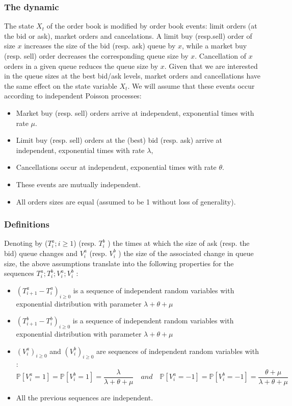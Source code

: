 \documentclass{article}
\begin{document}
\subsubsection{The dynamic}
The state $X_{t}$ of the order book is modified by order book events: limit orders (at the bid or ask),
market orders and cancelations. A limit buy (resp.sell) order of size $x$ increases the size of the bid (resp. ask) queue by $x$, while a market buy (resp. sell) order decreases the corresponding queue size by $x$. Cancellation of $x$ orders in a given queue reduces the queue size by $x$. Given that we are interested in the queue sizes at the best bid/ask levels, market orders and cancellations have the same effect on the state variable $X_{t}$.
We will assume that these events occur according to independent Poisson processes:
\begin{itemize}
\item Market buy (resp. sell) orders arrive at independent, exponential times with rate $\mu$.
\item Limit buy (resp. sell) orders at the (best) bid (resp. ask) arrive at independent, exponential
times with rate $\lambda$,
\item Cancellations occur at independent, exponential times with rate $\theta$.
\item These events are mutually independent.
\item All orders sizes are equal (assumed to be 1 without loss of generality).
\end{itemize}
\newpage 
\subsubsection{Definitions}
Denoting by ($T^{a}_{i} ; i \geq 1$) (resp. $T^{b}_{i}$ ) the times at which the size of ask (resp. the bid) queue changes
and $V^{a}_{i}$ (resp. $V^{b}_{i}$ ) the size of the associated change in queue size, the above assumptions translate
into the following properties for the sequences $T^{a}_{i}; T^{b}_{i}; V^{a}_{i}; V^{b}_{i}$ :
\begin{itemize}
\item $(T^{a}_{i+1} - T^{a}_{i})_{i \geq 0}$ is a sequence of independent random variables with exponential distribution
with parameter $\lambda+\theta+\mu$

\item $(T^{b}_{i+1} - T^{b}_{i})_{i \geq 0}$ is a sequence of independent random variables with exponential distribution
with parameter $\lambda+\theta+\mu$

\item $(V^{a}_{i})_{i \geq 0}$ and $(V^{b}_{i})_{i \geq 0}$ are sequences of independent random variables with :
\begin{equation}
\mathbb{P}[V^{a}_{i} = 1] = \mathbb{P}[V^{b}_{i} = 1]  = \frac{\lambda}{\lambda+\theta+\mu} \quad and \quad \mathbb{P}[V^{a}_{i} = -1] = \mathbb{P}[V^{b}_{i} = -1] = \frac{\theta+\mu}{\lambda+\theta+\mu}
\end{equation}

\item All the previous sequences are independent.
\end{itemize}
\end{document}
